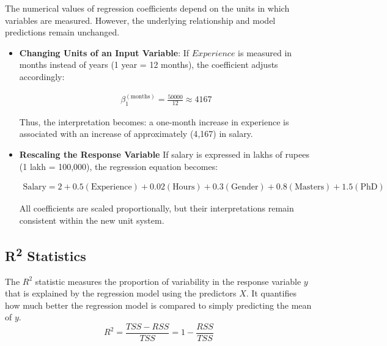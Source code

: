 \documentclass[10pt,a4paper]{article}
\begin{document}
	The numerical values of regression coefficients depend on the units in which variables are measured. However, the underlying relationship and model predictions remain unchanged.
	\begin{itemize}
		\item \textbf{Changing Units of an Input Variable}: If $Experience$ is measured in months instead of years (1 year = 12 months), the coefficient adjusts accordingly:

		\begin{align*}
		\beta_1^{(\text{months})} = \frac{50000}{12} \approx 4167
		\end{align*}

		Thus, the interpretation becomes: a one-month increase in experience is associated with an increase of approximately (\text{}4{,}167) in salary.
		
		
		\item \textbf{Rescaling the Response Variable}
		If salary is expressed in lakhs of rupees (1 lakh = 100,000), the regression equation becomes:
		
		\begin{align*}
		\text{Salary} = 2 + 0.5(\text{Experience}) + 0.02(\text{Hours}) + 0.3(\text{Gender}) + 0.8(\text{Masters}) + 1.5(\text{PhD})
		\end{align*}
		
		All coefficients are scaled proportionally, but their interpretations remain consistent within the new unit system.
		
	\end{itemize}
	


	\subsection{R\textsuperscript{2} Statistics}
	The $R^2$ statistic measures the proportion of variability in the response variable $y$ that is explained by the regression model using the predictors $X$.
	It quantifies how much better the regression model is compared to simply predicting the mean of $y$.
	 		\[
		R^2 = \frac{TSS - RSS}{TSS} = 1 - \frac{RSS}{TSS}
		\]
\end{document}
